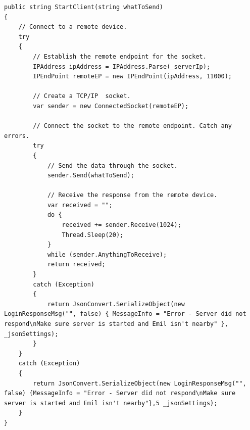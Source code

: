 \begin{lstlisting}[caption={StartClient(...)},label={code:ios_impl_client}]
public string StartClient(string whatToSend)
{
	// Connect to a remote device.
	try
	{
		// Establish the remote endpoint for the socket.
		IPAddress ipAddress = IPAddress.Parse(_serverIp);
		IPEndPoint remoteEP = new IPEndPoint(ipAddress, 11000);

		// Create a TCP/IP  socket.
		var sender = new ConnectedSocket(remoteEP); 

		// Connect the socket to the remote endpoint. Catch any errors.
		try
		{
			// Send the data through the socket.
			sender.Send(whatToSend);

			// Receive the response from the remote device.
			var received = "";
			do {
				received += sender.Receive(1024);
				Thread.Sleep(20);
			}
			while (sender.AnythingToReceive);
			return received;
		}
		catch (Exception)
		{
			return JsonConvert.SerializeObject(new LoginResponseMsg("", false) { MessageInfo = "Error - Server did not respond\nMake sure server is started and Emil isn't nearby" }, _jsonSettings);
		}
	}
	catch (Exception)
	{
		return JsonConvert.SerializeObject(new LoginResponseMsg("", false) {MessageInfo = "Error - Server did not respond\nMake sure server is started and Emil isn't nearby"},5 _jsonSettings);
	}
}
\end{lstlisting}